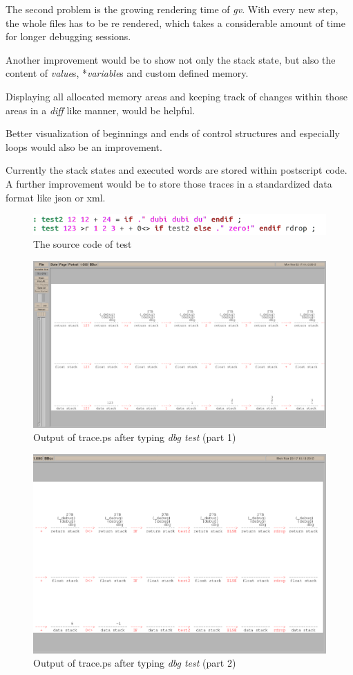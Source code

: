 The second problem is the growing rendering time of \emph{gv}. With every new step, the whole files has to be re rendered, which takes a considerable amount of time for longer debugging sessions.

Another improvement would be to show not only the stack state, but also the content of \emph{value}s, *\emph{variable}s and custom defined memory.

Displaying all allocated memory areas and keeping track of changes within those areas in a \emph{diff} like manner,  would be helpful.

Better visualization of beginnings and ends of control structures and especially loops would also be an improvement.

Currently the stack states and executed words are stored within postscript code. A further improvement would be to store those traces in a standardized data format like json or xml.

\begin{figure}[p]
    \centering
    \includegraphics[scale=0.50]{graphics/gfvis-test+test2_src.png}
    \caption{The source code of test}
    \label{fig:gfvis-test-src}
\end{figure}

\begin{figure}
    \centering
    \includegraphics[scale=0.30]{graphics/traceps1.png}
    \caption{Output of trace.ps after typing \emph{dbg test} (part 1)}
    \label{fig:traceps1}
\end{figure}

\begin{figure}
    \centering
    \includegraphics[scale=0.30]{graphics/traceps2.png}
    \caption{Output of trace.ps after typing \emph{dbg test} (part 2)}
    \label{fig:traceps2}
\end{figure}